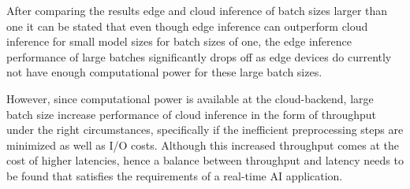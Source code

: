 After comparing the results edge and cloud inference of batch sizes larger than one it can be stated that even though edge inference can outperform cloud inference for small model sizes for batch sizes of one, the edge inference performance of large batches significantly drops off as edge devices do currently not have enough computational power for these large batch sizes.

However, since computational power is available at the cloud-backend, large batch size increase performance of cloud inference in the form of throughput under the right circumstances, specifically if the inefficient preprocessing steps are minimized as well as I/O costs.
Although this increased throughput comes at the cost of higher latencies, hence a balance between throughput and latency needs to be found that satisfies the requirements of a real-time AI application.

